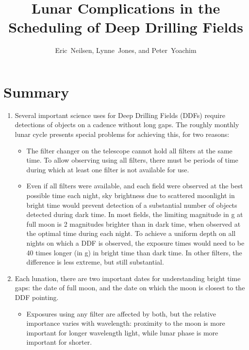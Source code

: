 \documentclass[DM,authoryear,toc]{lsstdoc}
\title{Lunar Complications in the Scheduling of Deep Drilling Fields}
\author{%
Eric~Neilsen, Lynne~Jones, and Peter~Yoachim
}
\date{\vcsDate}
\begin{document}
\maketitle


\section{Summary}

\begin{enumerate}
\item Several important science uses for Deep Drilling Fields (DDFs) require detections of objects on a cadence without long gaps.
  The roughly monthly lunar cycle presents special problems for achieving this, for two reasons:
\begin{itemize}
\item The filter changer on the telescope cannot hold all filters at the same time.
  To allow observing using all filters, there must be periods of time during which at least one filter is not available for use.
\item Even if all filters were available, and each field were observed at the best possible time each night, sky brightness due to scattered moonlight in bright time would prevent detection of a substantial number of objects detected during dark time.
  In most fields, the limiting magnitude in g at full moon is 2 magnitudes brighter than in dark time, when observed at the optimal time during each night.
  To achieve a uniform depth on all nights on which a DDF is observed, the exposure times would need to be 40 times longer (in g) in bright time than dark time.
  In other filters, the difference is less extreme, but still substantial.
\end{itemize}
\item Each lunation, there are two important dates for understanding bright time gaps: the date of full moon, and the date on which the moon is closest to the DDF pointing.
\begin{itemize}
\item Exposures using any filter are affected by both, but the relative importance varies with wavelength: proximity to the moon is more important for longer wavelength light, while lunar phase is more important for shorter.

\end{itemize}
\end{enumerate}
\end{document}
